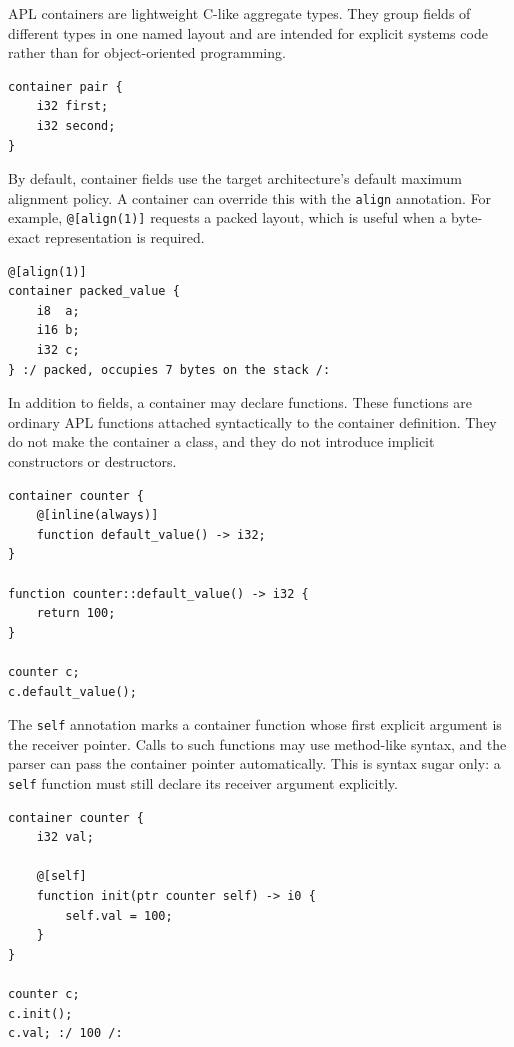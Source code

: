 \documentclass[10pt,twocolumn]{article}
\begin{document}
\par APL containers are lightweight C-like aggregate types. They group fields of different types in one named layout and are intended for explicit systems code rather than for object-oriented programming.

\begin{lstlisting}[language=APL,caption={A simple APL container.}]
container pair {
    i32 first;
    i32 second;
}
\end{lstlisting}

\par By default, container fields use the target architecture's default maximum alignment policy. A container can override this with the \texttt{align} annotation. For example, \texttt{@[align(1)]} requests a packed layout, which is useful when a byte-exact representation is required.

\begin{lstlisting}[language=APL,caption={Packed container layout.}]
@[align(1)]
container packed_value {
    i8  a;
    i16 b;
    i32 c;
} :/ packed, occupies 7 bytes on the stack /:
\end{lstlisting}

\par In addition to fields, a container may declare functions. These functions are ordinary APL functions attached syntactically to the container definition. They do not make the container a class, and they do not introduce implicit constructors or destructors.

\begin{lstlisting}[language=APL,caption={Container function.}]
container counter {
    @[inline(always)]
    function default_value() -> i32;
}

function counter::default_value() -> i32 {
    return 100;
}

counter c;
c.default_value();
\end{lstlisting}

\par The \texttt{self} annotation marks a container function whose first explicit argument is the receiver pointer. Calls to such functions may use method-like syntax, and the parser can pass the container pointer automatically. This is syntax sugar only: a \texttt{self} function must still declare its receiver argument explicitly.

\begin{lstlisting}[language=APL,caption={A self container function.}]
container counter {
    i32 val;

    @[self]
    function init(ptr counter self) -> i0 {
        self.val = 100;
    }
}

counter c;
c.init();
c.val; :/ 100 /:
\end{lstlisting}
\end{document}
